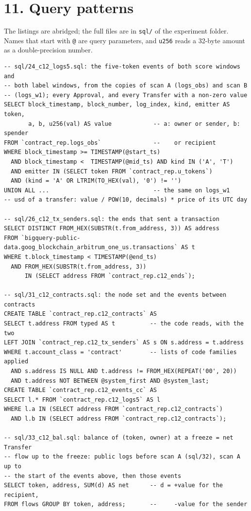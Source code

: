 \documentclass[10pt,letterpaper]{article}
\begin{document}
\section*{11. Query patterns}
The listings are abridged; the full files are in \texttt{sql/} of the experiment folder. Names that start with \texttt{@} are query parameters, and \texttt{u256} reads a 32-byte amount as a double-precision number.

\begin{Verbatim}[fontsize=\small]
-- sql/24_c12_logs5.sql: the five-token events of both score windows and
-- both label windows, from the copies of scan A (logs_obs) and scan B
-- (logs_w1); every Approval, and every Transfer with a non-zero value
SELECT block_timestamp, block_number, log_index, kind, emitter AS token,
       a, b, u256(val) AS value            -- a: owner or sender, b: spender
FROM `contract_rep.logs_obs`               --    or recipient
WHERE block_timestamp >= TIMESTAMP(@start_ts)
  AND block_timestamp <  TIMESTAMP(@mid_ts) AND kind IN ('A', 'T')
  AND emitter IN (SELECT token FROM `contract_rep.u_tokens`)
  AND (kind = 'A' OR LTRIM(TO_HEX(val), '0') != '')
UNION ALL ...                              -- the same on logs_w1
-- usd of a transfer: value / POW(10, decimals) * price of its UTC day

-- sql/26_c12_tx_senders.sql: the ends that sent a transaction
SELECT DISTINCT FROM_HEX(SUBSTR(t.from_address, 3)) AS address
FROM `bigquery-public-data.goog_blockchain_arbitrum_one_us.transactions` AS t
WHERE t.block_timestamp < TIMESTAMP(@end_ts)
  AND FROM_HEX(SUBSTR(t.from_address, 3))
      IN (SELECT address FROM `contract_rep.c12_ends`);

-- sql/31_c12_contracts.sql: the node set and the events between contracts
CREATE TABLE `contract_rep.c12_contracts` AS
SELECT t.address FROM typed AS t          -- the code reads, with the two
LEFT JOIN `contract_rep.c12_tx_senders` AS s ON s.address = t.address
WHERE t.account_class = 'contract'        -- lists of code families applied
  AND s.address IS NULL AND t.address != FROM_HEX(REPEAT('00', 20))
  AND t.address NOT BETWEEN @system_first AND @system_last;
CREATE TABLE `contract_rep.c12_events_cc` AS
SELECT l.* FROM `contract_rep.c12_logs5` AS l
WHERE l.a IN (SELECT address FROM `contract_rep.c12_contracts`)
  AND l.b IN (SELECT address FROM `contract_rep.c12_contracts`);

-- sql/33_c12_bal.sql: balance of (token, owner) at a freeze = net Transfer
-- flow up to the freeze: public logs before scan A (sql/32), scan A up to
-- the start of the events above, then those events
SELECT token, address, SUM(d) AS net      -- d = +value for the recipient,
FROM flows GROUP BY token, address;       --     -value for the sender


\end{Verbatim}
\end{document}
